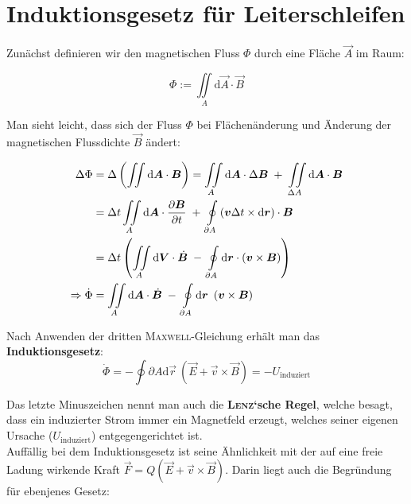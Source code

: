 \section{Induktionsgesetz für Leiterschleifen}

Zunächst definieren wir den magnetischen Fluss $\Phi$ durch eine Fläche $\vec{A}$ im Raum:

\begin{equation*}
\Phi := \iint\limits_A\mathrm{d}\vec{A}\cdot\vec{B}
\end{equation*}

Man sieht leicht, dass sich der Fluss $\Phi$ bei Flächenänderung und Änderung der magnetischen Flussdichte $\vec{B}$ ändert:

\begin{align*}
\Delta\Phi &=  \Delta\left(\iint\mathrm{d}\vec{A}\cdot\vec{B}\right) = \iint\limits_A\mathrm{d}\vec{A}\cdot\Delta\vec{B} \; + \; \iint\limits_{\Delta A}\mathrm{d}\vec{A}\cdot\vec{B}\\
&= \Delta t \iint\limits_A\mathrm{d}\vec{A}\cdot\pdiff{\vec{B}}{t} \; + \; \oint\limits_{\partial A}\left(\vec{v}\Delta t\times\mathrm{d}\vec{r}\right)\cdot\vec{B}\\
&= \Delta t\left(\iint\limits_A\mathrm{d}\vec{V}\cdot\dot{\vec{B}} \; - \; \oint\limits_{\partial A}\mathrm{d}\vec{r}\cdot\left(\vec{v}\times\vec{B}\right)\right)\\
\Rightarrow \dot{\Phi} &= \iint\limits_A\mathrm{d}\vec{A}\cdot\dot{\vec{B}} \; - \; \oint\limits_{\partial A}\mathrm{d}\vec{r} \ \left(\vec{v}\times\vec{B}\right)
\end{align*}

Nach Anwenden der dritten \textsc{Maxwell}-Gleichung erhält man das \textbf{Induktionsgesetz}:
\begin{equation*}
\dot{\Phi} = - \oint\limits{\partial A}\mathrm{d}\vec{r} \ \left(\vec{E} + \vec{v}\times\vec{B}\right) = - U_{\mathrm{induziert}}
\end{equation*}

Das letzte Minuszeichen nennt man auch die \textbf{\textsc{Lenz}`sche Regel}, welche besagt, dass ein induzierter Strom immer ein Magnetfeld erzeugt, welches seiner eigenen Ursache ($U_{\mathrm{induziert}}$) entgegengerichtet ist.
\ \\
Auffällig bei dem Induktionsgesetz ist seine Ähnlichkeit mit der auf eine freie Ladung wirkende Kraft $\vec{F} = Q(\vec{E} + \vec{v}\times\vec{B})$. Darin liegt auch die Begründung für ebenjenes Gesetz:\

